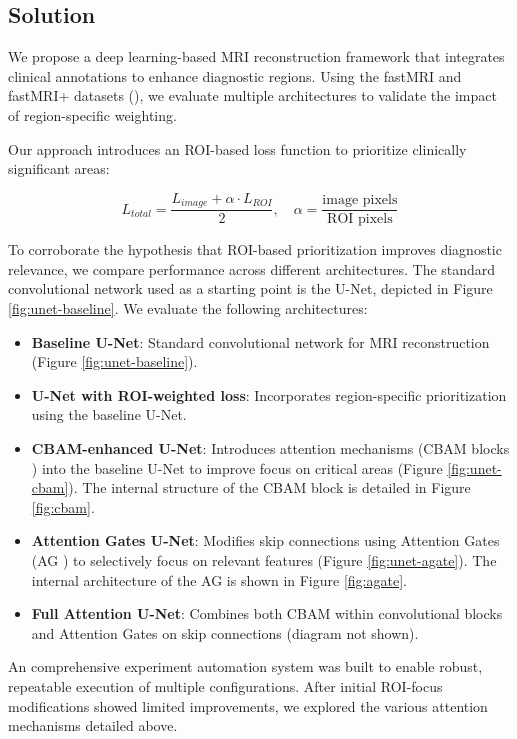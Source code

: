\documentclass[
	letterpaper, %
]{jdf}
\begin{document}
\subsection{Solution} %

We propose a deep learning-based MRI reconstruction framework that integrates clinical annotations to enhance diagnostic regions. Using the fastMRI and fastMRI+ datasets (\cite{fast_mri_plus}), we evaluate multiple architectures to validate the impact of region-specific weighting.

Our approach introduces an ROI-based loss function to prioritize clinically significant areas:

\begin{equation}
L_{total} = \frac{L_{image} + \alpha \cdot L_{ROI}}{2}, \quad 
\alpha = \frac{\text{image pixels}}{\text{ROI pixels}}
\end{equation}

To corroborate the hypothesis that ROI-based prioritization improves diagnostic relevance, we compare performance across different architectures. The standard convolutional network used as a starting point is the U-Net, depicted in Figure \ref{fig:unet-baseline}. We evaluate the following architectures:
\begin{itemize}
    \item \textbf{Baseline U-Net}: Standard convolutional network for MRI reconstruction (Figure \ref{fig:unet-baseline}).
    \item \textbf{U-Net with ROI-weighted loss}: Incorporates region-specific prioritization using the baseline U-Net.
    \item \textbf{CBAM-enhanced U-Net}: Introduces attention mechanisms (CBAM blocks \cite{cbam_paper}) into the baseline U-Net to improve focus on critical areas (Figure \ref{fig:unet-cbam}). The internal structure of the CBAM block is detailed in Figure \ref{fig:cbam}.
    \item \textbf{Attention Gates U-Net}: Modifies skip connections using Attention Gates (AG \cite{att_gate}) to selectively focus on relevant features (Figure \ref{fig:unet-agate}). The internal architecture of the AG is shown in Figure \ref{fig:agate}.
    \item \textbf{Full Attention U-Net}: Combines both CBAM within convolutional blocks and Attention Gates on skip connections (diagram not shown).
\end{itemize}

An comprehensive experiment automation system was built to enable robust, repeatable execution of multiple configurations. After initial ROI-focus modifications showed limited improvements, we explored the various attention mechanisms detailed above.
\end{document}
